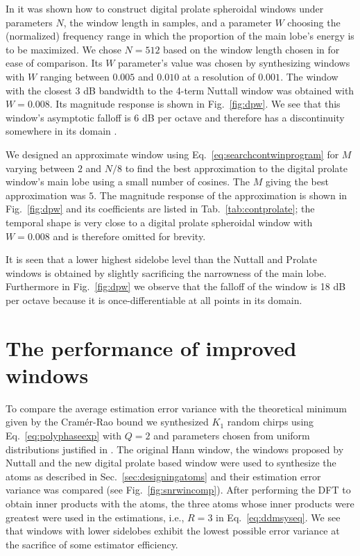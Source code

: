 \documentclass[twoside,a4paper]{article}
\begin{document}
In \cite{verma1996digital} it was shown how to construct digital prolate
spheroidal windows under parameters $N$, the window length in samples, and a
parameter $W$ choosing the (normalized) frequency range in which the proportion
of the main lobe's energy is to be maximized. We chose $N=512$ based on the
window length chosen in \cite{betser2009sinusoidal} for ease of comparison. Its
$W$ parameter's value was chosen by synthesizing windows with $W$ ranging
between $0.005$ and $0.010$ at a resolution of $0.001$. The window with the
closest 3 dB bandwidth to the 4-term Nuttall window was obtained with $W=0.008$.
Its magnitude response is shown in Fig.~\ref{fig:dpw}. We see that this window's
asymptotic falloff is 6 dB per octave and therefore has a discontinuity
somewhere in its domain \cite{nuttall1981some}.

We designed an approximate
window using Eq.~\ref{eq:searchcontwinprogram} for $M$ varying between $2$ and
$N/8$ to find the best approximation to the digital prolate window's main lobe
using a small number of cosines. The $M$ giving the best approximation was $5$.
The magnitude response of the approximation is shown in Fig.~\ref{fig:dpw} and
its coefficients are listed in Tab.~\ref{tab:contprolate}; the temporal shape is
very close to a digital prolate spheroidal window with $W=0.008$ and is
therefore omitted for brevity.

It is seen that a lower highest sidelobe level than the Nuttall and Prolate
windows is obtained by slightly sacrificing the narrowness of the main lobe. Furthermore in
Fig.~\ref{fig:dpw} we observe that the falloff of the window is 18 dB per octave
because it is once-differentiable at all points in its domain.

\section{The performance of improved windows}

To compare the average estimation error variance with the
theoretical minimum given by the Cram\'{e}r-Rao bound we synthesized $K_{1}$ random
chirps using Eq.~\ref{eq:polyphaseexp}
with $Q=2$ and parameters chosen from uniform distributions justified in
\cite{betser2009sinusoidal}. The original Hann window,
the windows proposed by Nuttall and the new digital prolate based window were
used to synthesize the atoms as described in Sec.~\ref{sec:designingatoms} and
their estimation error variance was compared (see
Fig.~\ref{fig:snrwincomp}). After performing the DFT to obtain inner products
with the atoms, the three atoms whose inner products were greatest were used in
the estimations, i.e., $R=3$ in Eq.~\ref{eq:ddmsyseq}. We see that windows with
lower sidelobes exhibit the lowest possible error variance at the sacrifice of
some estimator efficiency.
\end{document}
